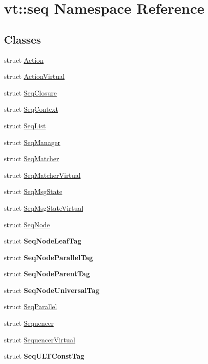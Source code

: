 \hypertarget{namespacevt_1_1seq}{}\section{vt\+:\+:seq Namespace Reference}
\label{namespacevt_1_1seq}
\subsection*{Classes}
\begin{DoxyCompactItemize}
\item 
struct \hyperlink{structvt_1_1seq_1_1_action}{Action}
\item 
struct \hyperlink{structvt_1_1seq_1_1_action_virtual}{Action\+Virtual}
\item 
struct \hyperlink{structvt_1_1seq_1_1_seq_closure}{Seq\+Closure}
\item 
struct \hyperlink{structvt_1_1seq_1_1_seq_context}{Seq\+Context}
\item 
struct \hyperlink{structvt_1_1seq_1_1_seq_list}{Seq\+List}
\item 
struct \hyperlink{structvt_1_1seq_1_1_seq_manager}{Seq\+Manager}
\item 
struct \hyperlink{structvt_1_1seq_1_1_seq_matcher}{Seq\+Matcher}
\item 
struct \hyperlink{structvt_1_1seq_1_1_seq_matcher_virtual}{Seq\+Matcher\+Virtual}
\item 
struct \hyperlink{structvt_1_1seq_1_1_seq_msg_state}{Seq\+Msg\+State}
\item 
struct \hyperlink{structvt_1_1seq_1_1_seq_msg_state_virtual}{Seq\+Msg\+State\+Virtual}
\item 
struct \hyperlink{structvt_1_1seq_1_1_seq_node}{Seq\+Node}
\item 
struct {\bfseries Seq\+Node\+Leaf\+Tag}
\item 
struct {\bfseries Seq\+Node\+Parallel\+Tag}
\item 
struct {\bfseries Seq\+Node\+Parent\+Tag}
\item 
struct {\bfseries Seq\+Node\+Universal\+Tag}
\item 
struct \hyperlink{structvt_1_1seq_1_1_seq_parallel}{Seq\+Parallel}
\item 
struct \hyperlink{structvt_1_1seq_1_1_sequencer}{Sequencer}
\item 
struct \hyperlink{structvt_1_1seq_1_1_sequencer_virtual}{Sequencer\+Virtual}
\item 
struct {\bfseries Seq\+U\+L\+T\+Const\+Tag}
\item 

\end{DoxyCompactItemize}
